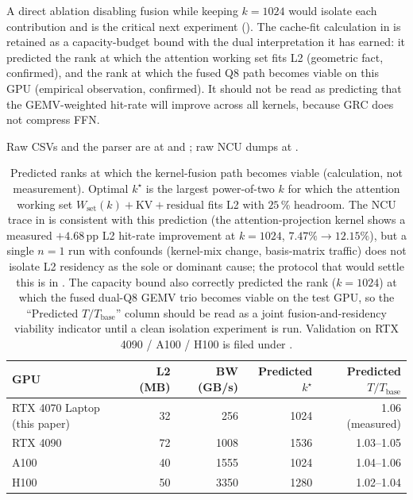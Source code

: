 \documentclass[11pt]{article}
\begin{document}
A direct ablation disabling fusion while keeping $k{=}1024$ would isolate
each contribution and is the critical next experiment ().
The cache-fit calculation in  is retained as a
capacity-budget bound with the dual interpretation it has earned: it
predicted the rank at which the attention working set fits L2 (geometric
fact, confirmed), and the rank at which the fused Q8 path becomes
viable on this GPU (empirical observation, confirmed). It should not be
read as predicting that the GEMV-weighted hit-rate will improve across all
kernels, because GRC does not compress FFN.

Raw CSVs and the parser are at
 and
; raw NCU dumps at
.

\begin{table}[h]\centering\small
\caption{Predicted ranks at which the kernel-fusion path becomes
viable (calculation, not measurement). Optimal $k^\star$ is the
largest power-of-two $k$ for which the attention working set
$W_\text{set}(k)+\text{KV}+\text{residual}$ fits L2 with $25$\,\%
headroom. The NCU trace in  is consistent with
this prediction (the attention-projection kernel shows a measured
$+4.68$\,pp L2 hit-rate improvement at $k{=}1024$, $7.47\%\to12.15\%$),
but a single $n{=}1$ run with confounds (kernel-mix change,
basis-matrix traffic) does not isolate L2 residency as the sole or
dominant cause; the protocol that would settle this is in
. The capacity bound also correctly
predicted the rank ($k{=}1024$) at which the fused dual-Q8
GEMV trio becomes viable on the test GPU, so the
``Predicted $T/T_\text{base}$'' column should be read as a joint
fusion-and-residency viability indicator until a clean isolation
experiment is run. Validation on RTX 4090 / A100 / H100 is filed
under .}
\label{tab:predict}
\begin{tabular}{@{}lrrrr@{}}
\toprule
GPU & L2 (MB) & BW (GB/s) & Predicted $k^\star$ & Predicted $T/T_\text{base}$ \\
\midrule
RTX 4070 Laptop (this paper) & 32 & 256 & 1024 & 1.06 (measured) \\
RTX 4090 & 72 & 1008 & 1536 & 1.03--1.05 \\
A100 & 40 & 1555 & 1024 & 1.04--1.06 \\
H100 & 50 & 3350 & 1280 & 1.02--1.04 \\
\bottomrule
\end{tabular}
\end{table}
\end{document}
